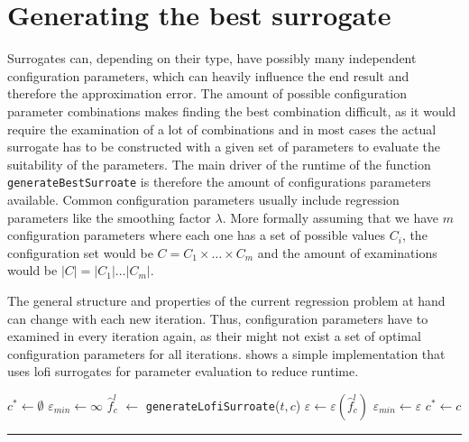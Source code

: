 \documentclass[
  a4paper,  %
  twoside,  %
  bibliography=totoc,
  headsepline,
  cleardoublepage=empty,
  parskip=half,
  draft=false
]{scrbook}
\newcommand{\delimit}{{\color{charcoal}\noindent\rule{\textwidth}{1pt}}}
\begin{document}
\section{Generating the best surrogate}

Surrogates can, depending on their type, have possibly many independent configuration parameters, which can heavily influence the end result and therefore the approximation error.
The amount of possible configuration parameter combinations makes finding the best combination difficult, as it would require the examination of a lot of combinations and in most cases the actual surrogate has to be constructed with a given set of parameters to evaluate the suitability of the parameters.
The main driver of the runtime of the function \texttt{generateBestSurroate} is therefore the amount of configurations parameters available.
Common configuration parameters usually include regression parameters like the smoothing factor $\lambda$.
More formally assuming that we have $m$ configuration parameters where each one has a set of possible values $C_i$, the configuration set would be $C=C_1 \times \dots \times C_m$ and the amount of examinations would be $|C|=|C_1| \dots |C_m|$.

The general structure and properties of the current regression problem at hand can change with each new iteration.
Thus, configuration parameters have to examined in every iteration again, as their might not exist a set of optimal configuration parameters for all iterations.
 shows a simple implementation that uses lofi surrogates for parameter evaluation to reduce runtime.

\newpage
\begin{mdframed}[style=algstyle,frametitle={\textbf{function} \texttt{generateBestSurroate}{$(C, t)$}}]
\normalsize
\vspace{5.5mm}
\begin{algorithmic}[1]
    \State $c^\ast \gets \emptyset$
    \State $\varepsilon_{min} \gets \infty$
      \State $\hat{f}_c^l$ $\gets$ \texttt{generateLofiSurroate}($t, c$)
    	\State $\varepsilon \gets \varepsilon(\hat{f}_c^l)$
    	  \State $\varepsilon_{min}\gets \varepsilon$
    	\State $c^\ast \gets c$
    	\EndIf
    \EndFor
    \State {}
\end{algorithmic}
\vspace{-1.5mm}
\delimit
	\label{alg:bestsur}
\end{mdframed}
\end{document}
